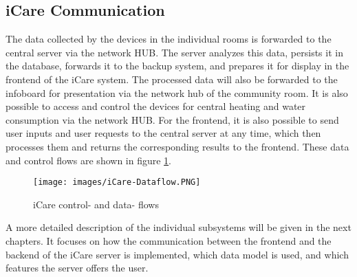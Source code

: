 \subsection{iCare Communication}
The data collected by the devices in the individual rooms is forwarded to the central server via the network HUB. The server analyzes this data, persists it in the database, forwards it to the backup system, and prepares it for display in the frontend of the iCare system. The processed data will also be forwarded to the infoboard for presentation via the network hub of the community room. It is also possible to access and control the devices for central heating and water consumption via the network HUB. For the frontend, it is also possible to send user inputs and user requests to the central server at any time, which then processes them and returns the corresponding results to the frontend. These data and control flows are shown in figure \ref{icare-dataflow}.
\begin{figure}[H]
	\centering
	\texttt{[image: images/iCare-Dataflow.PNG]}
	\caption{iCare control- and data- flows}
	\label{icare-dataflow}
\end{figure}

A more detailed description of the individual subsystems will be given in the next chapters. It focuses on how the communication between the frontend and the backend of the iCare server is implemented, which data model is used, and which features the server offers the user.